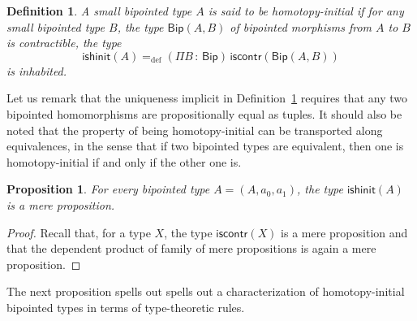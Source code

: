 \documentclass[10pt,a4paper,oneside,reqno]{amsart}
\numberwithin{equation}{section}
\theoremstyle{mythm}
\newtheorem{proposition}[theorem]{Proposition}
\theoremstyle{mydef}
\newtheorem{definition}[theorem]{Definition}
\theoremstyle{myrmk}
\newcommand{\ie}{\text{i.e.\ }}
\newcommand{\defeq}{=_{\mathrm{def}}}
\newcommand{\co}{\,{:}\,}
\newcommand{\iscontr}{\mathsf{iscontr}}
\newcommand{\ishinit}{\mathsf{ishinit}}
\newcommand{\Bip}{\mathsf{Bip}}
\newcommand{\BipHom}{\mathsf{Bip}}
\begin{document}
\begin{definition}\label{def:BoolInit}
A small bipointed type $A$ is said to be \emph{homotopy-initial}  if for any small bipointed type $B$, the type $\BipHom(A,B)$ of bipointed morphisms from $A$ to $B$
is contractible, \ie the type
\[
\ishinit(A) \defeq (\Pi B \co \Bip) \, \iscontr(\BipHom(A, B) )
\] 
is inhabited.
\end{definition}

Let us remark that the uniqueness implicit in Definition~\ref{def:BoolInit} requires that any two bipointed homomorphisms are propositionally equal as tuples. It should also be noted that the property of being  homotopy-initial  can be transported along equivalences, in the sense that if two bipointed types are equivalent, then one is homotopy-initial if and only if the other one is.  

\begin{proposition} \label{thm:isbiphinitishprop} For every bipointed type $A = (A, a_0, a_1)$, the type $\ishinit(A)$ is a mere proposition.
\end{proposition}

\begin{proof} Recall that, for a type $X$, the type $\iscontr(X)$ is a mere proposition and that the dependent product of family of mere propositions is again a mere proposition. 
\end{proof} 

The next proposition spells out spells out a  characterization of homotopy-initial bipointed types in terms of type-theoretic rules.
\end{document}

